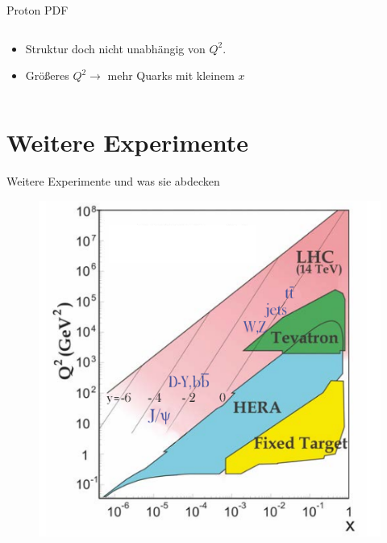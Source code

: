 \documentclass[aspectratio=1610, 9pt]{beamer}
\begin{document}
\begin{frame}{Proton PDF}
\begin{columns}
\begin{column}{0.5\textwidth}
\begin{itemize}
\begin{itemize}
        \end{itemize}
        \item{Struktur doch nicht unabhängig von $Q^2$.}
        \item{Größeres $Q^2 \rightarrow $ mehr Quarks mit kleinem $x$}
      \end{itemize}
    \end{column}

  \end{columns}
\end{frame}

\section{Weitere Experimente}
\begin{frame}{Weitere Experimente und was sie abdecken}
  \begin{figure}
    \centering
    \includegraphics[scale=0.35]{images/Experimente.png}
  \end{figure}
\end{frame}
\end{document}
